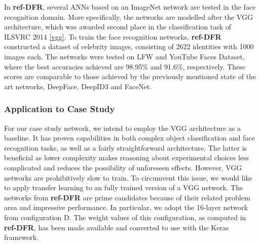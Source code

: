 \noindent In \textbf{ref-DFR}, several ANNs based on an ImageNet network are tested in the face recognition domain. More specifically, the networks are modelled after the VGG architecture, which was awarded second place in the classification task of ILSVRC 2014 \ref{vgg}. To train the face recognition networks, \textbf{ref-DFR} constructed a dataset of celebrity images, consisting of 2622 identities with 1000 images each. The networks were tested on LFW and YouTube Faces Dataset, where the best accuracies achieved are 98.95\% and 91.6\%, respectively. These scores are comparable to those achieved by the previously mentioned state of the art networks, DeepFace, DeepID3 and FaceNet.

\subsubsection{Application to Case Study}

For our case study network, we intend to employ the VGG architecture as a baseline. It has proven capabilities in both complex object classification and face recognition tasks, as well as a fairly straightforward architecture. The latter is beneficial as lower complexity makes reasoning about experimental choices less complicated and reduces the possibility of unforeseen effects. However, VGG networks are prohibitively slow to train. To circumvent this issue, we would like to apply transfer learning to an fully trained version of a VGG network. The networks from \textbf{ref-DFR} are prime candidates because of their related problem area and impressive performance. In particular, we adopt the 16-layer network from configuration D. The weight values of this configuration, as computed in \textbf{ref-DFR}, has been made available and converted to use with the Keras framework.



